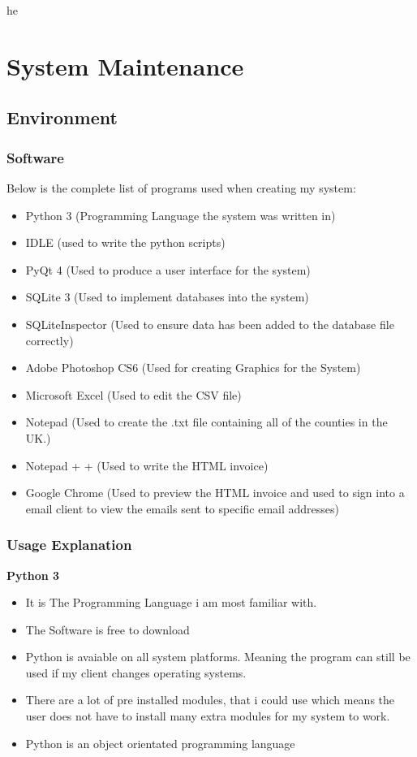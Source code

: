 he\chapter{System Maintenance}

\section{Environment}

\subsection{Software}

Below is the complete list of programs used when creating my system:

\begin{itemize}
	\item Python 3 (Programming Language the system was written in)
	\item IDLE (used to write the python scripts)
	\item PyQt 4 (Used to produce a user interface for the system)
    	\item SQLite 3 (Used to implement databases into the system)
	\item SQLiteInspector (Used to ensure data has been added to the database file correctly)
	\item Adobe Photoshop CS6 (Used for creating Graphics for the System)
	\item Microsoft Excel (Used to edit the CSV file)
	\item Notepad (Used to create the .txt file containing all of the counties in the UK.)
	\item Notepad + + (Used to write the HTML invoice)
	\item Google Chrome (Used to preview the HTML invoice and used to sign into a email client to view the emails sent to specific email addresses)
\end{itemize}

\pagebreak

\subsection{Usage Explanation}

\textbf{Python 3}
\begin{itemize}
	\item It is The Programming Language i am most familiar with.
	\item The Software is free to download
	\item Python is avaiable on all system platforms. Meaning the program can still be used if my client changes operating systems.
	\item There are a lot of pre installed modules, that i could use which means the user does not have to install many extra modules for my system to work.
	\item Python is an object orientated programming language
\end{itemize}
\vspace{5mm}

